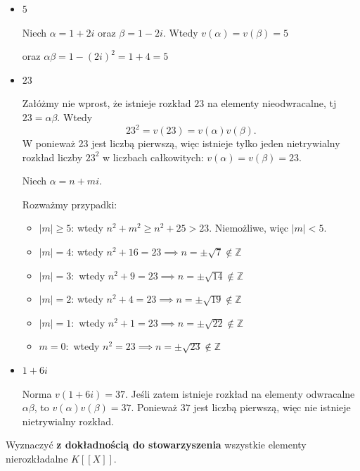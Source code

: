 \begin{solution}
\begin{enumerate}[label=\alph*)]
\begin{itemize}
					TODO

				\item $5$

					Niech $\alpha = 1 + 2i $ oraz $\beta = 1- 2i$. Wtedy $v\left( \alpha  \right) = v\left( \beta  \right) = 5$ 

					oraz $\alpha \beta = 1 - \left( 2i  \right) ^2 = 1 + 4 = 5$
				\item $23$

					Załóżmy nie wprost, że istnieje rozkład $23$ na elementy nieodwracalne, tj $23=\alpha \beta$. Wtedy
					\[
					23^2 = v\left( 23 \right) = v\left( \alpha  \right) v\left( \beta \right) 
					.\] 
					W ponieważ 23 jest liczbą pierwszą, więc istnieje tylko jeden nietrywialny rozkład liczby $23^2$ w liczbach całkowitych: $v(\alpha) = v(\beta) = 23$.

					Niech $\alpha = n +mi$.

					Rozważmy przypadki:
					\begin{itemize}
						\item $\left| m \right| \ge 5$: wtedy $n^2 + m^2 \ge n^2 + 25 > 23$. Niemożliwe, więc $\left| m \right| < 5.$
						\item $\left|m\right| = 4$: wtedy $n^2 + 16 = 23 \implies n = \pm \sqrt{7} \not\in \mathbb{Z}$ 
						\item $\left|m\right| = 3:$ wtedy $n^2 + 9 = 23 \implies n = \pm \sqrt{14} \not\in \mathbb{Z}$
						\item $\left|m\right| = 2$: wtedy $n^2 + 4 = 23 \implies n = \pm \sqrt{19} \not\in \mathbb{Z}$ 
						\item $\left|m\right| = 1:$ wtedy $n^2 + 1 = 23 \implies n = \pm \sqrt{22} \not\in \mathbb{Z}$ 
						\item $m = 0:$ wtedy  $n^2 = 23 \implies n = \pm \sqrt{23} \not\in \mathbb{Z}$
					\end{itemize}
				\item $1+6i$ 

					Norma $v\left( 1+6i \right)  = 37$. Jeśli zatem istnieje rozkład na elementy odwracalne $\alpha \beta $, to $v\left( \alpha  \right) v\left( \beta  \right) = 37$. Ponieważ $37$ jest liczbą pierwszą, więc nie istnieje nietrywialny rozkład.
			\end{itemize}
	\end{enumerate}
\end{solution} 
\begin{problem}[7]
Wyznaczyć \textbf{z dokładnością do stowarzyszenia} wszystkie elementy nierozkładalne $K[[X]]$.
\end{problem} 

